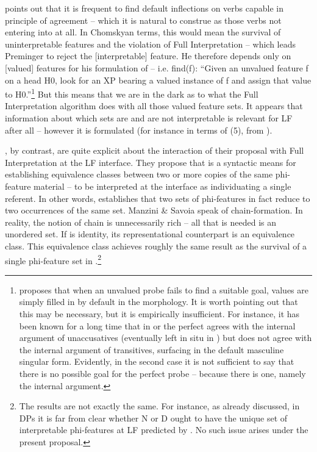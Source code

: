\documentclass[output=paper]{langsci/langscibook}
\begin{document}
\citet{Preminger2014}{} points out that it is frequent to find default inflections on verbs capable in principle of agreement – which it is natural to construe as those verbs not entering into  at all.{} In Chomskyan terms, this would mean the survival of uninterpretable features and the violation of Full Interpretation – which leads Preminger to reject the [interpretable] feature. He therefore {depends only on [valued] features for his formulation of  – i.e.} {fi}{nd(f): “Given an unvalued feature f on a head H0, look for an XP bearing a valued instance of f and assign that value to H0.”}\footnote{\citet{Preminger2014} proposes that when an unvalued probe fails to find a suitable goal, values are simply filled in by default in the morphology. It is worth pointing out that this may be necessary, but it is empirically insufficient. For instance, it has been known for a long time \citep{Kayne1989} that in  or  the perfect  agrees with the internal argument of unaccusatives (eventually left in situ in ) but does not agree with the internal argument of transitives, surfacing in the default masculine singular form. Evidently, in the second case it is not sufficient to say that there is no possible goal for the perfect  probe – because there is one, namely the internal argument.} { But this means that we are in the dark as to what the Full Interpretation algorithm does with all those valued feature sets. It appears that information about which sets are and are not interpretable is relevant for LF after all – however it is formulated (for instance in terms of (5), from \citealt{Baker2008}).}

   \citet{Manzini2007}, by contrast, are quite explicit about the interaction of their proposal with Full Interpretation at the LF interface. They propose that  is a syntactic means for establishing equivalence classes between two or more copies of the same phi-feature material – to be interpreted at the interface as individuating a single referent. In other words,  establishes that two sets of phi-features in fact reduce to two occurrences of the same set. Manzini \& Savoia speak of chain-formation. In reality, the notion of chain is unnecessarily rich – all that is needed is an unordered set. If  is identity, its representational counterpart is an equivalence class. This equivalence class achieves roughly the same result as the survival of a single phi-feature set in \citet{Chomsky2000,Chomsky2001Derivation}.\footnote{The results are not exactly the same. For instance, {as already discussed, in DPs it is far from clear whether N or D ought to have the unique set of interpretable phi-featu}{r}{es at LF}{ predicted by \citet{Chomsky2001Derivation}. No such issue arises under the present proposal.}}
\end{document}
